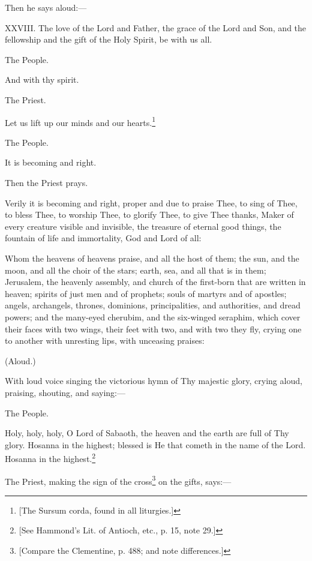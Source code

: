 Then he says aloud:—

XXVIII. The love of the Lord and Father, the grace of the Lord and Son, and the fellowship and the gift of the Holy Spirit, be with us all.

The People.

And with thy spirit.

The Priest.

Let us lift up our minds and our hearts.\footnote{\par{}  [The Sursum corda, found in all liturgies.]}

The People.

It is becoming and right.

Then the Priest prays.

Verily it is becoming and right, proper and due to praise Thee, to sing of Thee, to bless Thee, to worship Thee, to glorify Thee, to give Thee thanks, Maker of every creature visible and invisible, the treasure of eternal good things, the fountain of life and immortality, God and Lord of all:

Whom the heavens of heavens praise, and all the host of them; the sun, and the moon, and all the choir of the stars; earth, sea, and all that is in them; Jerusalem, the heavenly assembly, and church of the first-born that are written in heaven; spirits of just men and of prophets; souls of martyrs and of apostles; angels, archangels, thrones, dominions, principalities, and authorities, and dread powers; and the many-eyed cherubim, and the six-winged seraphim, which cover their faces with two wings, their feet with two, and with two they fly, crying one to another with unresting lips, with unceasing praises:

(Aloud.)

With loud voice singing the victorious hymn of Thy majestic glory, crying aloud, praising, shouting, and saying:—

The People.

Holy, holy, holy, O Lord of Sabaoth, the heaven and the earth are full of Thy glory. Hosanna in the highest; blessed is He that cometh in the name of the Lord. Hosanna in the highest.\footnote{\par{}  [See Hammond’s Lit. of Antioch, etc., p. 15, note 29.]}

The Priest, making the sign of the cross\footnote{\par{}  [Compare the Clementine, p. 488; and note differences.]} on the gifts, says:—

